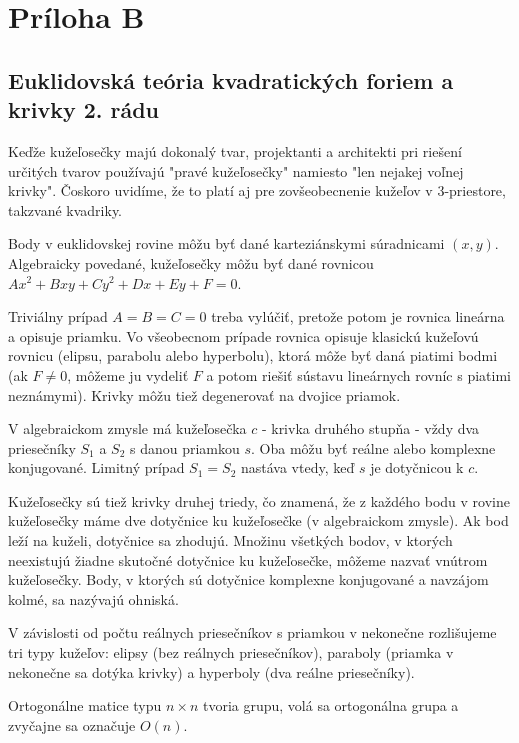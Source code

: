\chapter{Príloha B}
\label{pri:priloha2}
\section{Euklidovská teória kvadratických foriem a krivky 2. rádu}
Keďže kužeľosečky majú dokonalý tvar, projektanti a architekti pri riešení určitých tvarov používajú "pravé kužeľosečky" namiesto "len nejakej voľnej krivky". Čoskoro uvidíme, že to platí aj pre zovšeobecnenie kužeľov v 3-priestore, takzvané kvadriky.

Body v euklidovskej rovine môžu byť dané karteziánskymi súradnicami $(x, y)$. Algebraicky povedané, kužeľosečky môžu byť dané rovnicou $Ax^2 + Bxy + Cy^2 + Dx + Ey + F = 0$.

Triviálny prípad $A = B = C = 0$ treba vylúčiť, pretože potom je rovnica lineárna a opisuje priamku. Vo všeobecnom prípade rovnica opisuje klasickú kužeľovú rovnicu (elipsu, parabolu alebo hyperbolu), ktorá môže byť daná piatimi bodmi (ak $F \neq 0$, môžeme ju vydeliť $F$ a potom riešiť sústavu lineárnych rovníc s piatimi neznámymi). Krivky môžu tiež degenerovať na dvojice priamok.

V algebraickom zmysle má kužeľosečka $c$ - krivka druhého stupňa - vždy dva priesečníky $S_1$ a $S_2$ s danou priamkou $s$. Oba môžu byť reálne alebo komplexne konjugované. Limitný prípad $S_1 = S_2$ nastáva vtedy, keď $s$ je dotyčnicou k $c$.

Kužeľosečky sú tiež krivky druhej triedy, čo znamená, že z každého bodu v rovine kužeľosečky máme dve dotyčnice ku kužeľosečke (v algebraickom zmysle). Ak bod leží na kuželi, dotyčnice sa zhodujú. Množinu všetkých bodov, v ktorých neexistujú žiadne skutočné dotyčnice ku kužeľosečke, môžeme nazvať vnútrom kužeľosečky. Body, v ktorých sú dotyčnice komplexne konjugované a navzájom kolmé, sa nazývajú ohniská.

V závislosti od počtu reálnych priesečníkov s priamkou v nekonečne rozlišujeme tri typy kužeľov: elipsy (bez reálnych priesečníkov), paraboly (priamka v nekonečne sa dotýka krivky) a hyperboly (dva reálne priesečníky).

\begin{theorem}
Ortogonálne matice typu $n \times n $ tvoria grupu, volá sa ortogonálna
grupa a zvyčajne sa označuje $O(n)$.
\end{theorem}

